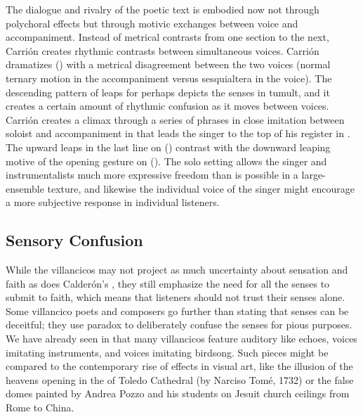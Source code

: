 The dialogue and rivalry of the poetic text is embodied now not through
polychoral effects but through motivic exchanges between voice and
accompaniment.
Instead of metrical contrasts from one section to the next, Carrión creates
rhythmic contrasts between simultaneous voices.
Carrión dramatizes  () with a metrical disagreement
between the two voices (normal ternary motion in the accompaniment versus
sesquialtera in the voice).
The descending pattern of leaps for  perhaps
depicts the senses in tumult, and it creates a certain amount of rhythmic
confusion as it moves between voices.
Carrión creates a climax through a series of phrases in close imitation between
soloist and accompaniment in  that leads the singer to the top
of his register in .
The upward leaps in the last line on  ()
contrast with the downward leaping motive of the opening gesture on
 ().
The solo setting allows the singer and instrumentalists much more expressive
freedom than is possible in a large-ensemble texture, and likewise the
individual voice of the singer might encourage a more subjective response in
individual listeners.

\subsection{Sensory Confusion}

While the  villancicos may not project as much
uncertainty about sensation and faith as does Calderón's , they still emphasize the need for all the senses to submit
to faith, which means that listeners should not trust their senses alone.
Some villancico poets and composers go further than stating that senses can be
deceitful; they use paradox to deliberately confuse the senses for pious
purposes.
We have already seen in  that many villancicos feature auditory
 like echoes, voices imitating instruments, and voices
imitating birdsong.
Such pieces might be compared to the contemporary rise of 
effects in visual art, like the illusion of the heavens opening in the
 of Toledo Cathedral (by Narciso Tomé, 1732) or the false
domes painted by Andrea Pozzo and his students on Jesuit church ceilings from
Rome to China.%
    \Autocites
    []{GroveArt}
    [110]{Bailey:Art}

